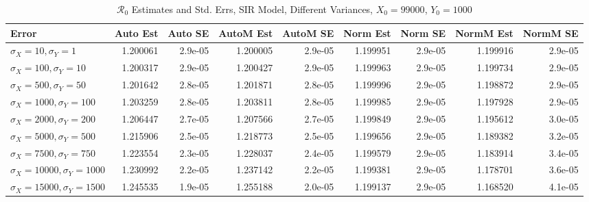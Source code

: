 \documentclass[12pt]{article}
\newcommand{\rr}{\ensuremath{\mathcal{R}_0}}
\begin{document}
\begin{table}[H]
	
	\caption{$\rr$ Estimates and Std. Errs, SIR Model, 
		Different Variances, $X_0 = 99000$, $Y_0 = 1000$}
	\begin{footnotesize}
		\hskip -1.7cm
		\begin{tabular}{l|r|r|r|r|r|r|r|r}
			\hline
			Error & Auto Est & Auto SE & AutoM Est & AutoM SE & Norm Est & Norm SE & NormM Est & NormM SE\\
			\hline
			$\sigma_X = 10, \sigma_Y = 1$ & 1.200061 & 2.9e-05 & 1.200005 & 2.9e-05 & 1.199951 & 2.9e-05 & 1.199916 & 2.9e-05\\
			\hline
			$\sigma_X = 100, \sigma_Y = 10$ & 1.200317 & 2.9e-05 & 1.200427 & 2.9e-05 & 1.199963 & 2.9e-05 & 1.199734 & 2.9e-05\\
			\hline
			$\sigma_X = 500, \sigma_Y = 50$ & 1.201642 & 2.8e-05 & 1.201871 & 2.8e-05 & 1.199996 & 2.9e-05 & 1.198872 & 2.9e-05\\
			\hline
			$\sigma_X = 1000, \sigma_Y = 100$ & 1.203259 & 2.8e-05 & 1.203811 & 2.8e-05 & 1.199985 & 2.9e-05 & 1.197928 & 2.9e-05\\
			\hline
			$\sigma_X = 2000, \sigma_Y = 200$ & 1.206447 & 2.7e-05 & 1.207566 & 2.7e-05 & 1.199849 & 2.9e-05 & 1.195612 & 3.0e-05\\
			\hline
			$\sigma_X = 5000, \sigma_Y = 500$ & 1.215906 & 2.5e-05 & 1.218773 & 2.5e-05 & 1.199656 & 2.9e-05 & 1.189382 & 3.2e-05\\
			\hline
			$\sigma_X = 7500, \sigma_Y = 750$ & 1.223554 & 2.3e-05 & 1.228037 & 2.4e-05 & 1.199579 & 2.9e-05 & 1.183914 & 3.4e-05\\
			\hline
			$\sigma_X = 10000, \sigma_Y = 1000$ & 1.230992 & 2.2e-05 & 1.237142 & 2.2e-05 & 1.199381 & 2.9e-05 & 1.178701 & 3.6e-05\\
			\hline
			$\sigma_X = 15000, \sigma_Y = 1500$ & 1.245535 & 1.9e-05 & 1.255188 & 2.0e-05 & 1.199137 & 2.9e-05 & 1.168520 & 4.1e-05\\
			\hline
		\end{tabular}
	\end{footnotesize}
\end{table}
\end{document}
